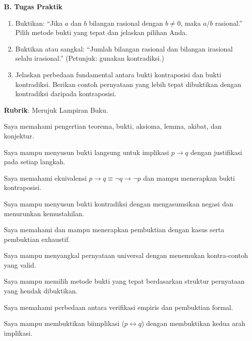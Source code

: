 \documentclass[../main]{subfiles}
\begin{document}
\begin{asesmen}
\textbf{B. Tugas Praktik}
\begin{enumerate}
  \item Buktikan: ``Jika $a$ dan $b$ bilangan rasional dengan $b \neq 0$, maka $a/b$ rasional.'' Pilih metode bukti yang tepat dan jelaskan pilihan Anda.
  \item Buktikan atau sangkal: ``Jumlah bilangan rasional dan bilangan irasional selalu irasional.'' (Petunjuk: gunakan kontradiksi.)
  \item Jelaskan perbedaan fundamental antara bukti kontraposisi dan bukti kontradiksi. Berikan contoh pernyataan yang lebih tepat dibuktikan dengan kontradiksi daripada kontraposisi.
\end{enumerate}

\textbf{Rubrik}: Merujuk Lampiran Buku.
\end{asesmen}


\begin{checklist}
  \item Saya memahami pengertian teorema, bukti, aksioma, lemma, akibat, dan konjektur.
  \item Saya mampu menyusun bukti langsung untuk implikasi $p \rightarrow q$ dengan justifikasi pada setiap langkah.
  \item Saya memahami ekuivalensi $p \rightarrow q \equiv \neg q \rightarrow \neg p$ dan mampu menerapkan bukti kontraposisi.
  \item Saya mampu menyusun bukti kontradiksi dengan mengasumsikan negasi dan menurunkan kemustahilan.
  \item Saya memahami dan mampu menerapkan pembuktian dengan kasus serta pembuktian exhaustif.
  \item Saya mampu menyangkal pernyataan universal dengan menemukan kontra-contoh yang valid.
  \item Saya mampu memilih metode bukti yang tepat berdasarkan struktur pernyataan yang hendak dibuktikan.
  \item Saya memahami perbedaan antara verifikasi empiris dan pembuktian formal.
  \item Saya mampu membuktikan biimplikasi ($p \leftrightarrow q$) dengan membuktikan kedua arah implikasi.
\end{checklist}

\end{document}
